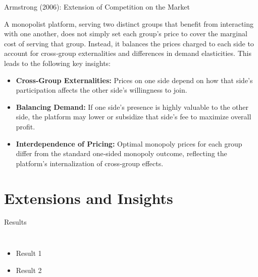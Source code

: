 \documentclass[aspectratio=169]{beamer}  %
\begin{document}
\begin{frame}{Armstrong (2006): Extension of Competition on the Market}
    \justifying  %
    
    A monopolist platform, serving two distinct groups that benefit from interacting 
    with one another, does not simply set each group’s price to cover the marginal 
    cost of serving that group. Instead, it balances the prices charged to each side 
    to account for cross‐group externalities and differences in demand elasticities.
    This leads to the following key insights:
    
    \begin{itemize}
        \item \textbf{Cross‐Group Externalities:} Prices on one side depend on how 
        that side’s participation affects the other side’s willingness to join.
    
        \item \textbf{Balancing Demand:} If one side’s presence is highly valuable 
        to the other side, the platform may lower or subsidize that side’s fee 
        to maximize overall profit.
    
        \item \textbf{Interdependence of Pricing:} Optimal monopoly prices for each 
        group differ from the standard one‐sided monopoly outcome, reflecting 
        the platform’s internalization of cross‐group effects.
    \end{itemize}
    
\end{frame}

\section{Extensions and Insights}
\begin{frame}{Results}
    \begin{columns}
        \begin{itemize}
            \item Result 1
            \item Result 2
        \end{itemize}
        
    \end{columns}
\end{frame}
\end{document}
